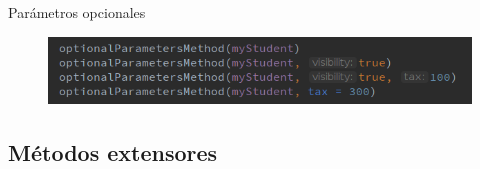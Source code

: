 \begin{frame}{Parámetros opcionales}{}
    \begin{figure}[h]
    \centering
    \includegraphics[width=\textwidth]{images/kotlin_vs_java/optional_param_2}
    \end{figure}
\end{frame}

\subsection{Métodos extensores}
